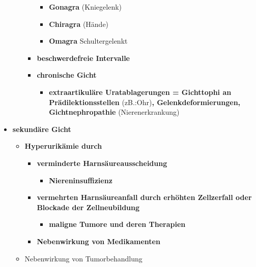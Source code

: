 \begin{itemize}
\begin{itemize}
\begin{itemize}
\begin{itemize}
								\item \textbf{Gonagra} (Kniegelenk)
								\item \textbf{Chiragra} (Hände)
								\item \textbf{Omagra} Schultergelenkt
							\end{itemize}
						\item \textbf{beschwerdefreie Intervalle}
						\item \textbf{chronische Gicht}
							\begin{itemize}
								\item \textbf{extraartikuläre Uratablagerungen = Gichttophi an Prädilektionsstellen} (zB.:Ohr)\textbf{, Gelenkdeformierungen, Gichtnephropathie} (Nierenerkrankung)
							\end{itemize}
					\end{itemize}								
			\end{itemize}
		\item \textbf{sekundäre Gicht}
			\begin{itemize}
				\item \textbf{Hyperurikämie durch}
					\begin{itemize}
						\item \textbf{verminderte Harnsäureausscheidung}
							\begin{itemize}
								\item \textbf{Niereninsuffizienz}
							\end{itemize}
						\item \textbf{vermehrten Harnsäureanfall durch erhöhten Zellzerfall oder Blockade der Zellneubildung}
							\begin{itemize}
								\item \textbf{maligne Tumore und deren Therapien}
							\end{itemize}
						\item \textbf{Nebenwirkung von Medikamenten}
					\end{itemize}
				\item Nebenwirkung von Tumorbehandlung
			\end{itemize}
	\end{itemize}
	
